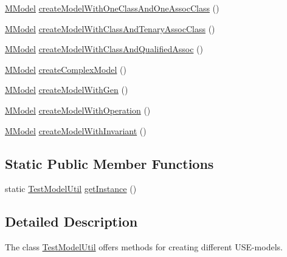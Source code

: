 \begin{DoxyCompactItemize}
\item 
\hyperlink{classorg_1_1tzi_1_1use_1_1uml_1_1mm_1_1_m_model}{M\-Model} \hyperlink{classorg_1_1tzi_1_1use_1_1uml_1_1mm_1_1_test_model_util_aca751b03d934f35f82fadf0d53719f6c}{create\-Model\-With\-One\-Class\-And\-One\-Assoc\-Class} ()
\item 
\hyperlink{classorg_1_1tzi_1_1use_1_1uml_1_1mm_1_1_m_model}{M\-Model} \hyperlink{classorg_1_1tzi_1_1use_1_1uml_1_1mm_1_1_test_model_util_a53aa1b3eab04cbe94fb31f88c98c877d}{create\-Model\-With\-Class\-And\-Tenary\-Assoc\-Class} ()
\item 
\hyperlink{classorg_1_1tzi_1_1use_1_1uml_1_1mm_1_1_m_model}{M\-Model} \hyperlink{classorg_1_1tzi_1_1use_1_1uml_1_1mm_1_1_test_model_util_a756b2854b4b03c8e9b7a16d82a2a705b}{create\-Model\-With\-Class\-And\-Qualified\-Assoc} ()
\item 
\hyperlink{classorg_1_1tzi_1_1use_1_1uml_1_1mm_1_1_m_model}{M\-Model} \hyperlink{classorg_1_1tzi_1_1use_1_1uml_1_1mm_1_1_test_model_util_a2a2fff53643800bce2480976522ba080}{create\-Complex\-Model} ()
\item 
\hyperlink{classorg_1_1tzi_1_1use_1_1uml_1_1mm_1_1_m_model}{M\-Model} \hyperlink{classorg_1_1tzi_1_1use_1_1uml_1_1mm_1_1_test_model_util_aa6b6c50372d6c2d2aa388ddcefa05916}{create\-Model\-With\-Gen} ()
\item 
\hyperlink{classorg_1_1tzi_1_1use_1_1uml_1_1mm_1_1_m_model}{M\-Model} \hyperlink{classorg_1_1tzi_1_1use_1_1uml_1_1mm_1_1_test_model_util_a1a5dce417d86299955c0f0ccc2118886}{create\-Model\-With\-Operation} ()
\item 
\hyperlink{classorg_1_1tzi_1_1use_1_1uml_1_1mm_1_1_m_model}{M\-Model} \hyperlink{classorg_1_1tzi_1_1use_1_1uml_1_1mm_1_1_test_model_util_aefc7cb07bac26b810d2c33eab3e57c52}{create\-Model\-With\-Invariant} ()
\end{DoxyCompactItemize}
\subsection*{Static Public Member Functions}
\begin{DoxyCompactItemize}
\item 
static \hyperlink{classorg_1_1tzi_1_1use_1_1uml_1_1mm_1_1_test_model_util}{Test\-Model\-Util} \hyperlink{classorg_1_1tzi_1_1use_1_1uml_1_1mm_1_1_test_model_util_ad8546c3f644eb600936dffaf890a05f2}{get\-Instance} ()
\end{DoxyCompactItemize}


\subsection{Detailed Description}
The class {\ttfamily \hyperlink{classorg_1_1tzi_1_1use_1_1uml_1_1mm_1_1_test_model_util}{Test\-Model\-Util}} offers methods for creating different U\-S\-E-\/models.

